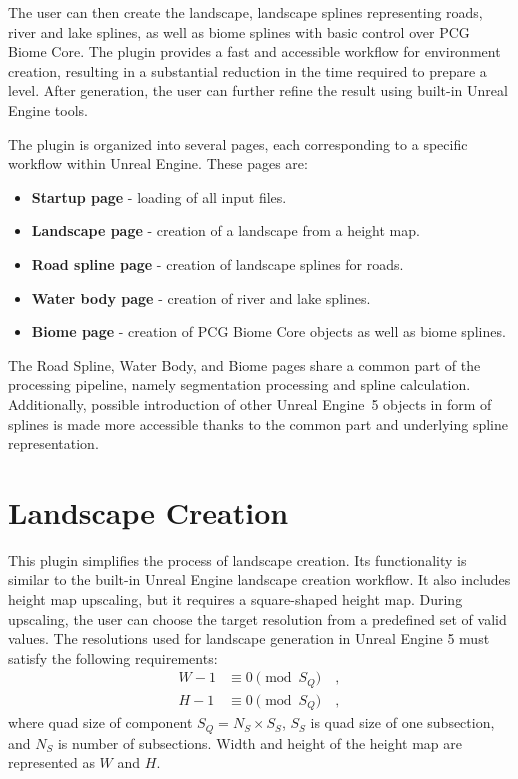 The user can then create the landscape, landscape splines representing roads, river and lake splines, as well as biome splines with basic control over \ac{PCG} Biome Core. The plugin provides a fast and accessible workflow for environment creation, resulting in a substantial reduction in the time required to prepare a level. After generation, the user can further refine the result using built-in Unreal Engine tools.

The plugin is organized into several pages, each corresponding to a specific workflow within Unreal Engine. These pages are:
\begin{itemize}
	\item \textbf{Startup page} - loading of all input files.
	\item \textbf{Landscape page} - creation of a landscape from a height map.
	\item \textbf{Road spline page} - creation of landscape splines for roads.
	\item \textbf{Water body page} - creation of river and lake splines.
	\item \textbf{Biome page} - creation of \ac{PCG} Biome Core objects as well as biome splines.
\end{itemize}

The Road Spline, Water Body, and Biome pages share a common part of the processing pipeline, namely segmentation processing and spline calculation. Additionally, possible introduction of other Unreal Engine~5 objects in form of splines is made more accessible thanks to the common part and underlying spline representation.

\section{Landscape Creation}

This plugin simplifies the process of landscape creation. Its functionality is similar to the built-in Unreal Engine landscape creation workflow. It also includes height map upscaling, but it requires a square-shaped height map. During upscaling, the user can choose the target resolution from a predefined set of valid values. The resolutions used for landscape generation in Unreal Engine 5 must satisfy the following requirements:
\begin{equation}
	\begin{aligned}
		W - 1 &\equiv 0 \pmod{S_Q}\quad, \\
		H - 1 &\equiv 0 \pmod{S_Q}\quad,
	\end{aligned}
\end{equation}
where quad size of component $S_Q = N_S \times S_S$, $S_S$ is quad size of one subsection, and $N_S$ is number of subsections. Width and height of the height map are represented as $W$ and $H$.

